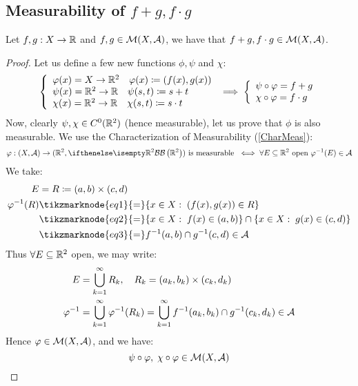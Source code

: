 \subsection{Measurability of \texorpdfstring{$f + g, f\cdot g$}{sum f and g, product f and g}} \label{meas:sumprod}
Let $f,g:X\to\mathbb{R}$ and $f,g\in\mathcal{M}(X,\mathcal{A})$, we have that $f+g, f\cdot g \in \mathcal{M}(X, \mathcal{A})$.

\begin{proof}
    Let us define a few new functions $\phi, \psi$ and $\chi$:
    \[
        \left\{ \begin{array}{l}
            \varphi(x) = X\to\mathbb{R}^2 \quad \varphi(x) \coloneqq \left( f(x), g(x) \right) \\
            \psi(x) = \mathbb{R}^2\to\mathbb{R} \quad \psi(s,t) \coloneqq s+t                    \\
            \chi(x) = \mathbb{R}^2\to\mathbb{R} \quad \chi(s,t) \coloneqq s\cdot t
        \end{array} \right.
        \implies
        \left\{ \begin{array}{l}
            \psi \circ \varphi = f + g \\
            \chi \circ \varphi = f \cdot g
        \end{array} \right.
    \]
    Now, clearly $\psi,\chi \in C^0(\mathbb{R}^2)$ (hence measurable), let us prove that $\phi $ is also measurable. We use the Characterization of Measurability (\ref{CharMeas}):
    \[
        \phi: (X,\A)\to (\R^2,\B[\R^2]) \text{ is measurable } \iff \forall E \subseteq \R^2 \text{ open } \phi^{-1}(E) \in \A
    \]
    We take:
    \begin{align*}
        E            & = R \coloneqq (a,b) \times (c,d)                                                         \\
        \phi^{-1}(R) & \tikzmarknode{eq1}{=} \{ x\in X: \; (f(x),g(x))\in R \}                                  \\
                     & \tikzmarknode{eq2}{=} \{ x\in X: \; f(x)\in (a,b) \} \cap \{ x\in X: \; g(x)\in (c,d) \} \\
                     & \tikzmarknode{eq3}{=} f^{-1}(a,b) \cap g^{-1}(c,d) \in \A
    \end{align*} 
    Thus $\forall E \subseteq \mathbb{R}^2$ open, we may write:
    \begin{align*}
        E         & = \bigcup_{k=1}^\infty R_k, \quad R_k = (a_k,b_k) \times (c_k,d_k)                                       \\
        \varphi^{-1} & = \bigcup_{k=1}^\infty \varphi^{-1}(R_k) = \bigcup_{k=1}^\infty f^{-1}(a_k,b_k) \cap g^{-1}(c_k,d_k) \in \mathcal{A}
    \end{align*}
    Hence $\varphi \in \mathcal{M}(X,\mathcal{A})$, and we have:
    \[
        \psi \circ \varphi, \; \chi \circ \varphi \in \mathcal{M}(X,\mathcal{A})
    \]
\end{proof}

